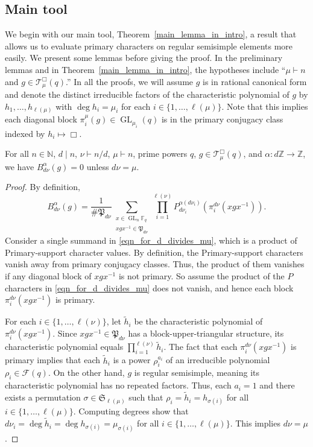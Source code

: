 \documentclass[Unicode,ALCO]{cedram}
\DeclareMathOperator{\GL}{GL}
\newcommand{\F}{\mathbb{F}}
\newcommand{\CF}{\mathcal{F}}
\newcommand{\N}{\mathbb{N}}
\newcommand{\FS}{\mathfrak{S}}
\newcommand{\CT}{\mathcal{T}}
\newcommand{\Z}{\mathbb{Z}}
\newcommand{\para}{\mathfrak{P}}
\begin{document}
\subsection{Main tool} \label{reg_ss}

We begin with our main tool, Theorem~\ref{main_lemma_in_intro}, a result that allows us to evaluate primary characters on regular semisimple elements more easily.
We present some lemmas before giving the proof.
In the preliminary lemmas and in Theorem~\ref{main_lemma_in_intro}, the hypotheses include ``\(\mu \vdash n\) and \(g \in \CT_\mu^\Box (q)\).''
In all the proofs, we will assume \(g\) is in rational canonical form and denote the distinct irreducible factors of the characteristic polynomial of \(g\) by \(h_1,\ldots,h_{\ell(\mu)}\) with \(\deg h_i = \mu_i\) for each \(i \in \{1,\ldots,\ell(\mu)\}\).
Note that this implies each diagonal block \(\pi_i^\mu (g) \in \GL_{\mu_i} (q)\) is in the primary conjugacy class indexed by \(h_i \mapsto \Box\).


\begin{lemma}
\label{d_divides_mu}
For all \(n \in \N\), \(d \mid n\), \(\nu \vdash n / d\), \(\mu \vdash n\), prime powers \(q\), \(g \in \CT_\mu^\Box (q)\), and \(\alpha : d \Z \to \Z\), we have \(B_{d\nu}^\alpha(g) = 0\) unless \(d \nu = \mu\).
\end{lemma}
\begin{proof}
By definition,
\begin{equation}
\label{eqn_for_d_divides_mu}
B_{d \nu}^\alpha (g)
=
\frac{1}{\#\para_{d \nu}}
\sum_{\substack{x \in \GL_n \F_q \\ xgx^{-1} \in \para_{d \nu}}}
\prod_{i = 1}^{\ell(\nu)}
P_{d \nu_i}^{\alpha (d \nu_i)} \left (\pi^{d \nu}_i (xgx^{-1}) \right ).
\end{equation}
Consider a single summand in \eqref{eqn_for_d_divides_mu}, which is a product of Primary-support character values.
By definition, the Primary-support characters vanish away from primary conjugacy classes.
Thus, the product of them vanishes if any diagonal block of \(xgx^{-1}\) is not primary.
So assume the product of the $P$ characters in \eqref{eqn_for_d_divides_mu} does not vanish, and hence each block \(\pi_i^{d \nu} (xgx^{-1})\) is primary.

For each \(i \in \{1,\ldots,\ell(\nu)\}\), let \(\tilde{h}_i\) be the characteristic polynomial of \(\pi^{d \nu}_i (xgx^{-1})\).
Since \(xgx^{-1} \in \para_{d \nu}\) has a block-upper-triangular structure, its characteristic polynomial equals \(\prod_{i=1}^{\ell(\nu)} \tilde{h}_i\).
The fact that each \(\pi^{d \nu}_i ( xgx^{-1})\) is primary implies that each \(\tilde{h}_i\) is a power \(\rho_i^{a_i}\) of an irreducible polynomial \(\rho_i \in \CF (q)\).
On the other hand, \(g\) is regular semisimple, meaning its characteristic polynomial has no repeated factors.
Thus, each \(a_i = 1\) and there exists a permutation \(\sigma \in \FS_{\ell(\mu)}\) such that \(\rho_i = \tilde{h}_i = h_{\sigma(i)}\) for all \(i \in \{1,\ldots,\ell(\mu)\}\).
Computing degrees show that \(d \nu_i = \deg \tilde{h}_i = \deg h_{\sigma(i)} = \mu_{\sigma(i)}\) for all \(i \in \{1,\ldots,\ell(\mu)\}\).
This implies \(d \nu = \mu\).
\end{proof}
\end{document}
